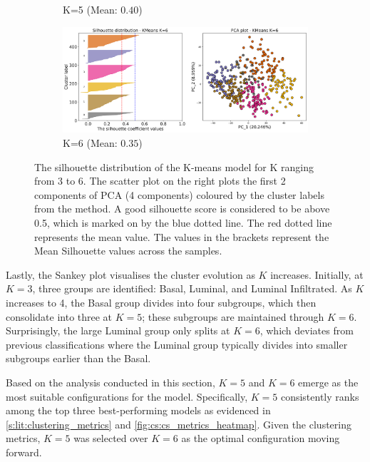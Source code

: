 \begin{figure}[H]
\begin{subfigure}[!t]{0.49\textwidth}
        \caption{K=5 (Mean: $0.40$)}
    \end{subfigure}
    \centering
    \begin{subfigure}[!t]{0.49\textwidth}
        \includegraphics[width=\textwidth]{Sections/ClusteringAnalysis/Resources/cs_top3/sill_distrib/KMeans_6_sill_distrib.png}
        \caption{K=6 (Mean: $0.35$)}
    \end{subfigure}
    \centering
    \caption{The silhouette distribution of the K-means model for K ranging from 3 to 6. The scatter plot on the right plots the first 2 components of PCA (4 components) coloured by the cluster labels from the method. A good silhouette score is considered to be above 0.5, which is marked on by the blue dotted line. The red dotted line represents the mean value. The values in the brackets represent the Mean Silhouette values across the samples.}
    \label{fig:cs:sill_distrib}
\end{figure}


Lastly, the Sankey plot visualises the cluster evolution as $K$ increases. Initially, at $K=3$, three groups are identified: Basal, Luminal, and Luminal Infiltrated. As $K$ increases to 4, the Basal group divides into four subgroups, which then consolidate into three at $K=5$; these subgroups are maintained through $K=6$. Surprisingly, the large Luminal group only splits at $K=6$, which deviates from previous classifications where the Luminal group typically divides into smaller subgroups earlier than the Basal.

Based on the analysis conducted in this section, $K=5$ and $K=6$ emerge as the most suitable configurations for the model. Specifically, $K=5$ consistently ranks among the top three best-performing models as evidenced in \cref{s:lit:clustering_metrics} and \cref{fig:cs:cs_metrics_heatmap}. Given the clustering metrics, $K=5$ was selected over $K=6$ as the optimal configuration moving forward.


